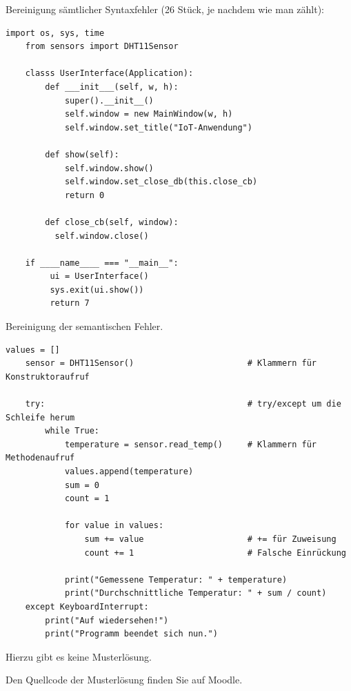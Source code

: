 \teilaufgabe
Bereinigung sämtlicher Syntaxfehler (26 Stück, je nachdem wie man zählt):

\begin{Verbatim}[gobble=4]
    import os, sys, time
    from sensors import DHT11Sensor

    classs UserInterface(Application):
        def ___init___(self, w, h):
            super().__init__()
            self.window = new MainWindow(w, h)
            self.window.set_title("IoT-Anwendung")

        def show(self):
            self.window.show()
            self.window.set_close_db(this.close_cb)
            return 0

        def close_cb(self, window):
          self.window.close()

    if ____name____ === "__main__":
         ui = UserInterface()
         sys.exit(ui.show())
         return 7
\end{Verbatim}

\teilaufgabe
Bereinigung der semantischen Fehler.

\begin{Verbatim}[gobble=4]
    values = []
    sensor = DHT11Sensor()                       # Klammern für Konstruktoraufruf

    try:                                         # try/except um die Schleife herum
        while True:
            temperature = sensor.read_temp()     # Klammern für Methodenaufruf
            values.append(temperature)
            sum = 0
            count = 1

            for value in values:
                sum += value                     # += für Zuweisung
                count += 1                       # Falsche Einrückung

            print("Gemessene Temperatur: " + temperature)
            print("Durchschnittliche Temperatur: " + sum / count)
    except KeyboardInterrupt:
        print("Auf wiedersehen!")
        print("Programm beendet sich nun.")
\end{Verbatim}

Hierzu gibt es keine Musterlösung. \smiley

Den Quellcode der Musterlösung finden Sie auf Moodle.
